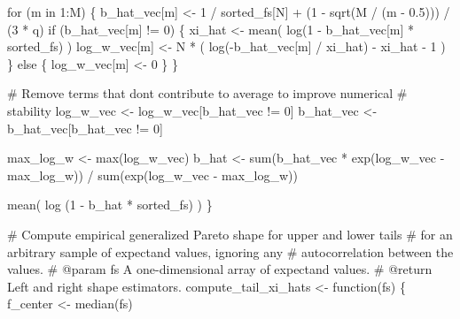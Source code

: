 \documentclass[
  letterpaper,
  DIV=11,
  numbers=noendperiod]{scrartcl}
\newenvironment{Shaded}{\begin{snugshade}}{\end{snugshade}}
\newcommand{\CommentTok}[1]{\textcolor[rgb]{0.37,0.37,0.37}{#1}}
\newcommand{\ControlFlowTok}[1]{\textcolor[rgb]{0.00,0.23,0.31}{#1}}
\newcommand{\DecValTok}[1]{\textcolor[rgb]{0.68,0.00,0.00}{#1}}
\newcommand{\FloatTok}[1]{\textcolor[rgb]{0.68,0.00,0.00}{#1}}
\newcommand{\FunctionTok}[1]{\textcolor[rgb]{0.28,0.35,0.67}{#1}}
\newcommand{\NormalTok}[1]{\textcolor[rgb]{0.00,0.23,0.31}{#1}}
\newcommand{\OtherTok}[1]{\textcolor[rgb]{0.00,0.23,0.31}{#1}}
\newcommand{\SpecialCharTok}[1]{\textcolor[rgb]{0.37,0.37,0.37}{#1}}
\begin{document}
\begin{Shaded}
\begin{Highlighting}[]
  \ControlFlowTok{for}\NormalTok{ (m }\ControlFlowTok{in} \DecValTok{1}\SpecialCharTok{:}\NormalTok{M) \{}
\NormalTok{    b\_hat\_vec[m] }\OtherTok{\textless{}{-}} \DecValTok{1} \SpecialCharTok{/}\NormalTok{ sorted\_fs[N] }\SpecialCharTok{+} 
\NormalTok{                 (}\DecValTok{1} \SpecialCharTok{{-}} \FunctionTok{sqrt}\NormalTok{(M }\SpecialCharTok{/}\NormalTok{ (m }\SpecialCharTok{{-}} \FloatTok{0.5}\NormalTok{))) }\SpecialCharTok{/}\NormalTok{ (}\DecValTok{3} \SpecialCharTok{*}\NormalTok{ q)}
    \ControlFlowTok{if}\NormalTok{ (b\_hat\_vec[m] }\SpecialCharTok{!=} \DecValTok{0}\NormalTok{) \{}
\NormalTok{      xi\_hat }\OtherTok{\textless{}{-}} \FunctionTok{mean}\NormalTok{( }\FunctionTok{log}\NormalTok{(}\DecValTok{1} \SpecialCharTok{{-}}\NormalTok{ b\_hat\_vec[m] }\SpecialCharTok{*}\NormalTok{ sorted\_fs) )}
\NormalTok{      log\_w\_vec[m] }\OtherTok{\textless{}{-}}\NormalTok{ N }\SpecialCharTok{*}\NormalTok{ ( }\FunctionTok{log}\NormalTok{(}\SpecialCharTok{{-}}\NormalTok{b\_hat\_vec[m] }\SpecialCharTok{/}\NormalTok{ xi\_hat) }\SpecialCharTok{{-}}\NormalTok{ xi\_hat }\SpecialCharTok{{-}} \DecValTok{1}\NormalTok{ )}
\NormalTok{    \} }\ControlFlowTok{else}\NormalTok{ \{}
\NormalTok{      log\_w\_vec[m] }\OtherTok{\textless{}{-}} \DecValTok{0}
\NormalTok{    \}}
\NormalTok{  \}}
  
  \CommentTok{\# Remove terms that don\textquotesingle{}t contribute to average to improve numerical }
  \CommentTok{\# stability}
\NormalTok{  log\_w\_vec }\OtherTok{\textless{}{-}}\NormalTok{ log\_w\_vec[b\_hat\_vec }\SpecialCharTok{!=} \DecValTok{0}\NormalTok{]}
\NormalTok{  b\_hat\_vec }\OtherTok{\textless{}{-}}\NormalTok{ b\_hat\_vec[b\_hat\_vec }\SpecialCharTok{!=} \DecValTok{0}\NormalTok{]}

\NormalTok{  max\_log\_w }\OtherTok{\textless{}{-}} \FunctionTok{max}\NormalTok{(log\_w\_vec)}
\NormalTok{  b\_hat }\OtherTok{\textless{}{-}} \FunctionTok{sum}\NormalTok{(b\_hat\_vec }\SpecialCharTok{*} \FunctionTok{exp}\NormalTok{(log\_w\_vec }\SpecialCharTok{{-}}\NormalTok{ max\_log\_w)) }\SpecialCharTok{/}
           \FunctionTok{sum}\NormalTok{(}\FunctionTok{exp}\NormalTok{(log\_w\_vec }\SpecialCharTok{{-}}\NormalTok{ max\_log\_w))}

  \FunctionTok{mean}\NormalTok{( }\FunctionTok{log}\NormalTok{ (}\DecValTok{1} \SpecialCharTok{{-}}\NormalTok{ b\_hat }\SpecialCharTok{*}\NormalTok{ sorted\_fs) )}
\NormalTok{\}}

\CommentTok{\# Compute empirical generalized Pareto shape for upper and lower tails}
\CommentTok{\# for an arbitrary sample of expectand values, ignoring any }
\CommentTok{\# autocorrelation between the values.}
\CommentTok{\# @param fs A one{-}dimensional array of expectand values.}
\CommentTok{\# @return Left and right shape estimators.}
\NormalTok{compute\_tail\_xi\_hats }\OtherTok{\textless{}{-}} \ControlFlowTok{function}\NormalTok{(fs) \{}
\NormalTok{  f\_center }\OtherTok{\textless{}{-}} \FunctionTok{median}\NormalTok{(fs)}
  

\end{Highlighting}
\end{Shaded}
\end{document}
